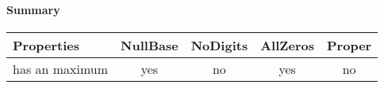 \documentclass[\main/thesis.tex]{subfiles}
\begin{document}
\paragraph{Summary}

\begin{center}
    \begin{adjustbox}{max width=\textwidth}
    \begin{tabular}{ | l | c | c | c | c | }
    \textbf{Properties} & \textbf{NullBase} & \textbf{NoDigits} & \textbf{AllZeros} & \textbf{Proper} \\
    \hline
    has an maximum & yes & no & yes & no \\
    \end{tabular}
    \end{adjustbox}
\end{center}
\end{document}
